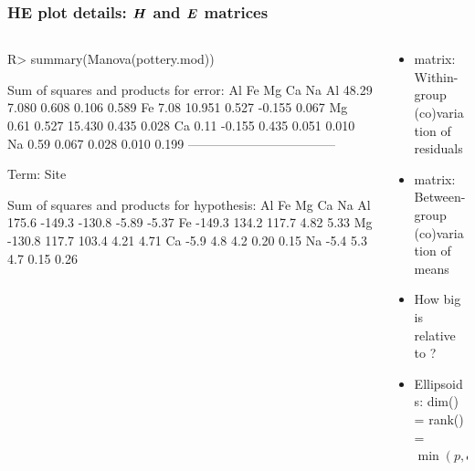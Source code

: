 \begin{frame}
	\frametitle{HE plot details: $\bm{H}$ and $\bm{E}$ matrices}
\begin{columns}[t]
 \begin{column}{0.55\textwidth}
\begin{CodeInput}
R> summary(Manova(pottery.mod))
\end{CodeInput}
\begin{CodeOutput}[fontsize=\footnotesize,baselinestretch=0.8]
Sum of squares and products for error:
      Al     Fe     Mg     Ca    Na
Al 48.29  7.080  0.608  0.106 0.589
Fe  7.08 10.951  0.527 -0.155 0.067
Mg  0.61  0.527 15.430  0.435 0.028
Ca  0.11 -0.155  0.435  0.051 0.010
Na  0.59  0.067  0.028  0.010 0.199
-----------------------------------
 
Term: Site 

Sum of squares and products for hypothesis:
       Al     Fe     Mg    Ca    Na
Al  175.6 -149.3 -130.8 -5.89 -5.37
Fe -149.3  134.2  117.7  4.82  5.33
Mg -130.8  117.7  103.4  4.21  4.71
Ca   -5.9    4.8    4.2  0.20  0.15
Na   -5.4    5.3    4.7  0.15  0.26
\end{CodeOutput} 
 \end{column}
 \begin{column}{0.45\textwidth}
 	\begin{itemize}
 		\item \alert{ matrix}:  Within-group (co)variation of residuals
 		\item \alert{ matrix}:  Between-group (co)variation of means
 		\item How big is  relative to ?
 	  \item Ellipsoids: dim() = rank() = $\min( p, df_h)$
  \end{itemize}
 \end{column}
\end{columns}

\end{frame}

